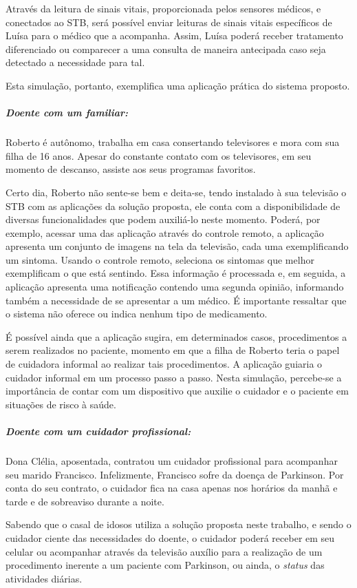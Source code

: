 Através da leitura de sinais vitais, proporcionada pelos sensores médicos,
e conectados ao STB, será possível enviar leituras de sinais vitais específicos 
de Luísa para o médico que a acompanha. Assim, Luísa poderá receber tratamento
diferenciado ou comparecer a uma consulta de maneira antecipada caso seja
detectado a necessidade para tal.

Esta simulação, portanto, exemplifica uma aplicação prática do sistema 
proposto.

\subparagraph{Doente com um familiar:}

Roberto é autônomo, trabalha em casa consertando televisores e mora com sua
filha de 16 anos. Apesar do constante contato com os televisores, em seu momento
de descanso, assiste aos seus programas favoritos.

Certo dia, Roberto não sente-se bem e deita-se, tendo instalado à sua televisão
o STB com as aplicações da solução proposta, ele conta com a disponibilidade de
diversas funcionalidades que podem auxiliá-lo neste momento. Poderá, por
exemplo, acessar uma das aplicação através do controle remoto, a aplicação
apresenta um conjunto de imagens na tela da televisão, cada uma exemplificando
um sintoma.  Usando o controle remoto, seleciona os sintomas que melhor
exemplificam o que está sentindo. Essa informação é processada e, em seguida, a
aplicação apresenta uma notificação contendo uma segunda opinião, informando
também a necessidade de se apresentar a um médico. É importante ressaltar que
o sistema não oferece ou indica nenhum tipo de medicamento.

É possível ainda que a aplicação sugira, em determinados casos, procedimentos a
serem realizados no paciente, momento em que a filha de Roberto teria o papel de
cuidadora informal ao realizar tais procedimentos. A aplicação guiaria o
cuidador informal em um processo passo a passo. Nesta simulação,  percebe-se a
importância de contar com um dispositivo que auxilie o cuidador e o paciente em
situações de risco à saúde.

\subparagraph{Doente com um cuidador profissional:}

Dona Clélia, aposentada, contratou um cuidador profissional para acompanhar seu
marido Francisco. Infelizmente, Francisco sofre da doença de Parkinson. Por conta
do seu contrato, o cuidador fica na casa apenas nos horários da manhã e tarde e 
de sobreaviso durante a noite.

Sabendo que o casal de idosos utiliza a solução proposta neste trabalho, e sendo o
cuidador ciente das necessidades do doente, o cuidador poderá receber em seu celular ou
acompanhar através da televisão auxílio para a realização de um procedimento inerente
a um paciente com Parkinson, ou ainda, o \textit{status} das atividades diárias.

